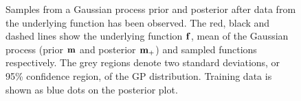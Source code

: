 \begin{figure}[t]
\centering
\small
{}
\hfill
{}
\caption{Samples from a Gaussian process prior and posterior after data from the underlying function has been observed. The red, black and dashed lines show the underlying function $\mathbf{f}$, mean of the Gaussian process (prior $\mathbf{m}$ and posterior $\mathbf{m}_+$) and sampled functions respectively. The grey regions denote two standard deviations, or 95\% confidence region, of the GP distribution. Training data is shown as blue dots on the posterior plot.}
\label{fig:priorpost}
\end{figure}


